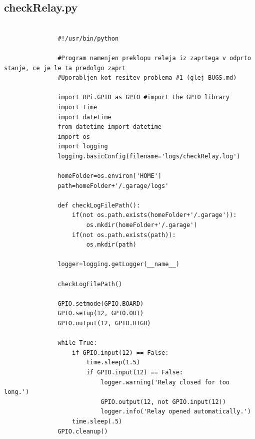 \documentclass[11pt]{article}
\begin{document}
\subsection{checkRelay.py}
\begin{verbatim}

               #!/usr/bin/python

               #Program namenjen preklopu releja iz zaprtega v odprto stanje, ce je le ta predolgo zaprt
               #Uporabljen kot resitev problema #1 (glej BUGS.md)

               import RPi.GPIO as GPIO #import the GPIO library
               import time
               import datetime
               from datetime import datetime
               import os
               import logging
               logging.basicConfig(filename='logs/checkRelay.log')

               homeFolder=os.environ['HOME']
               path=homeFolder+'/.garage/logs'

               def checkLogFilePath():
                   if(not os.path.exists(homeFolder+'/.garage')):
                       os.mkdir(homeFolder+'/.garage')
                   if(not os.path.exists(path)):
                       os.mkdir(path)

               logger=logging.getLogger(__name__)

               checkLogFilePath()

               GPIO.setmode(GPIO.BOARD)
               GPIO.setup(12, GPIO.OUT)
               GPIO.output(12, GPIO.HIGH)

               while True:
                   if GPIO.input(12) == False:
                       time.sleep(1.5)
                       if GPIO.input(12) == False:
                           logger.warning('Relay closed for too long.')
                           GPIO.output(12, not GPIO.input(12))
                           logger.info('Relay opened automatically.')
                   time.sleep(.5)
               GPIO.cleanup()
\end{verbatim}
\end{document}
